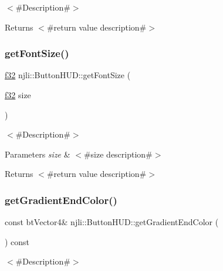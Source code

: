 $<$\#\+Description\#$>$

\begin{DoxyReturn}{Returns}
$<$\#return value description\#$>$ 
\end{DoxyReturn}
\mbox{\label{classnjli_1_1_button_h_u_d_a256f464d6b5893f9cfa3eceb15f46220}} 
\subsubsection{\texorpdfstring{get\+Font\+Size()}{getFontSize()}}
{\footnotesize\ttfamily \mbox{\hyperlink{_util_8h_a5f6906312a689f27d70e9d086649d3fd}{f32}} njli\+::\+Button\+H\+U\+D\+::get\+Font\+Size (\begin{DoxyParamCaption}\item[{\mbox{\hyperlink{_util_8h_a5f6906312a689f27d70e9d086649d3fd}{f32}}}]{size }\end{DoxyParamCaption})}

$<$\#\+Description\#$>$


\begin{DoxyParams}{Parameters}
{\em size} & $<$\#size description\#$>$\\
\hline
\end{DoxyParams}
\begin{DoxyReturn}{Returns}
$<$\#return value description\#$>$ 
\end{DoxyReturn}
\mbox{\label{classnjli_1_1_button_h_u_d_a8527937688cb50f4c57af65e51df2d6a}} 
\subsubsection{\texorpdfstring{get\+Gradient\+End\+Color()}{getGradientEndColor()}}
{\footnotesize\ttfamily const bt\+Vector4\& njli\+::\+Button\+H\+U\+D\+::get\+Gradient\+End\+Color (\begin{DoxyParamCaption}{ }\end{DoxyParamCaption}) const}

$<$\#\+Description\#$>$

